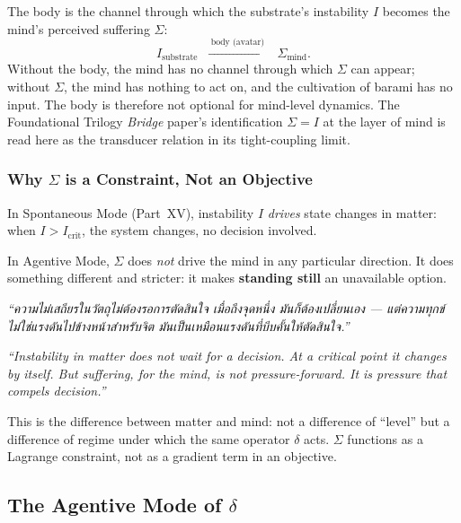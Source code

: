 \documentclass[12pt, a4paper]{article}
\begin{document}
\begin{formalbox}[title={DEF-MB01: The Body as Sensory Transducer}]
The body is the channel through which the substrate's instability
$I$ becomes the mind's perceived suffering $\Sigma$:
\[
  I_{\mathrm{substrate}}
  \;\;\xrightarrow{\;\text{body (avatar)}\;}\;\;
  \Sigma_{\mathrm{mind}}.
\]
Without the body, the mind has no channel through which $\Sigma$ can
appear; without $\Sigma$, the mind has nothing to act on, and the
cultivation of barami has no input. The body is therefore not
optional for mind-level dynamics. The Foundational Trilogy
\emph{Bridge} paper's identification $\Sigma = I$ at the layer of mind
is read here as the transducer relation in its tight-coupling limit.
\end{formalbox}

\subsubsection{Why $\Sigma$ is a Constraint, Not an Objective}

In Spontaneous Mode (Part~XV), instability $I$ \emph{drives} state
changes in matter: when $I > I_{\mathrm{crit}}$, the system changes,
no decision involved.

In Agentive Mode, $\Sigma$ does \emph{not} drive the mind in any
particular direction. It does something different and stricter: it
makes \textbf{standing still} an unavailable option.

\begin{keybox}[title={The decisive distinction (council distillation)}]
\textit{``ความไม่เสถียรในวัตถุไม่ต้องรอการตัดสินใจ เมื่อถึงจุดหนึ่ง
มันก็ต้องเปลี่ยนเอง — แต่ความทุกข์ไม่ใช่แรงดันไปข้างหน้าสำหรับจิต
มันเป็นเหมือนแรงดันที่บีบคั้นให้ตัดสินใจ.''}

\smallskip
\textit{``Instability in matter does not wait for a decision. At a
critical point it changes by itself. But suffering, for the mind, is
not pressure-forward. It is pressure that compels decision.''}

\smallskip
This is the difference between matter and mind: not a difference of
``level'' but a difference of regime under which the same operator
$\delta$ acts. $\Sigma$ functions as a Lagrange constraint, not as a
gradient term in an objective.
\end{keybox}

\subsection{The Agentive Mode of $\delta$}
\end{document}
